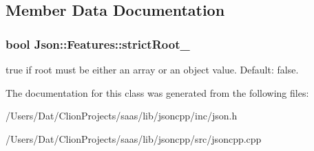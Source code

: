 \subsection{Member Data Documentation}
\subsubsection[{\texorpdfstring{strict\+Root\+\_\+}{strictRoot_}}]{\setlength{\rightskip}{0pt plus 5cm}bool Json\+::\+Features\+::strict\+Root\+\_\+}\hypertarget{class_json_1_1_features_a1162c37a1458adc32582b585b552f9c3}{}\label{class_json_1_1_features_a1162c37a1458adc32582b585b552f9c3}
{\ttfamily true} if root must be either an array or an object value. Default\+: {\ttfamily false}. 

The documentation for this class was generated from the following files\+:\begin{DoxyCompactItemize}
\item 
/\+Users/\+Dat/\+Clion\+Projects/saas/lib/jsoncpp/inc/json.\+h\item 
/\+Users/\+Dat/\+Clion\+Projects/saas/lib/jsoncpp/src/jsoncpp.\+cpp\end{DoxyCompactItemize}
